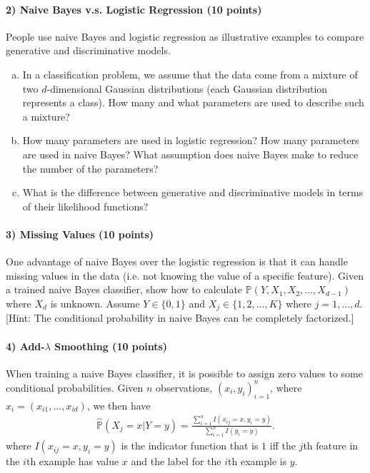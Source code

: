\documentclass[11pt]{article}
\begin{document}
\paragraph{2) Naive Bayes v.s. Logistic Regression (10 points)}
People use naive Bayes and logistic regression as illustrative examples to compare generative and discriminative models.
\begin{enumerate}[(a)]
\item In a classification problem, we assume that the data come from a mixture of two $d$-dimensional Gaussian distributions (each Gaussian distribution represents a class). How many and what parameters are used to describe such a mixture?
\item How many parameters are used in logistic regression?  How many parameters are used in naive Bayes? What assumption does naive Bayes make to reduce the number of the parameters?
\item What is the difference between generative and discriminative models in terms of their likelihood functions?
\end{enumerate}

\paragraph{3) Missing Values (10 points)} 

One advantage of naive Bayes over the logistic regression is that it can handle missing values in the data (i.e. not knowing the value of a specific feature). Given a trained naive Bayes classifier, show how to calculate $\mathbb{P}(Y, X_1, X_2, ..., X_{d-1})$ where $X_d$ is unknown. Assume $Y \in \{0,1\}$ and $X_j \in \{1,2,...,K\}$ where $j=1,...,d$. [Hint: The conditional probability in naive Bayes can be completely factorized.]

\paragraph{4) Add-$\lambda$ Smoothing (10 points)} 

When training a naive Bayes classifier, it is possible to assign zero values to some conditional probabilities. Given $n$ observations, $(x_i,y_i)_{i=1}^n$, where $x_i = (x_{i1},...,x_{id})$, we then have
\begin{align}\label{original-one}
\hat{\mathbb{P}}(X_j=x|Y=y) = \frac{\sum_{i=1}^nI(x_{ij}=x,y_i=y)}{\sum_{i=1}^nI(y_i=y)}.
\end{align}
where $I(x_{ij}=x,y_i=y)$ is the indicator function that is $1$ iff the $j$th feature in the $i$th example has value $x$ and the label for the $i$th example is $y$.
\end{document}
